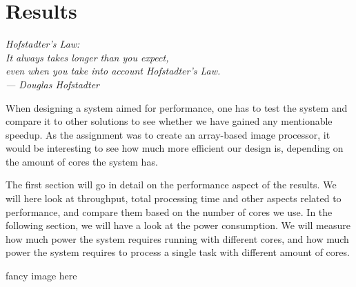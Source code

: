 \chapter{Results}\label{ch:res}

\begin{flushright}{\slshape
    Hofstadter's Law:\\
    It always takes longer than you expect,\\
    even when you take into account Hofstadter's Law.\\ \medskip
    --- Douglas Hofstadter}
\end{flushright}

When designing a system aimed for performance, one has to test the system and
compare it to other solutions to see whether we have gained any mentionable
speedup. As the assignment was to create an array-based image processor, it
would be interesting to see how much more efficient our design is, depending on
the amount of cores the system has.

The first section will go in detail on the performance aspect of the results. We
will here look at throughput, total processing time and other aspects related to
performance, and compare them based on the number of cores we use. In the
following section, we will have a look at the power consumption. We will measure
how much power the system requires running with different cores, and how much
power the system requires to process a single task with different amount of
cores.

{\sc fancy image here}




